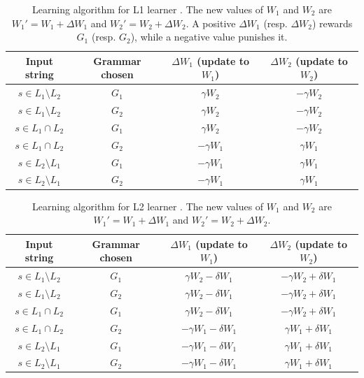 \begin{table}
\caption{Learning algorithm for L1 learner \parencite{BushMosteller1955,Yang2002}. The new values of $W_1$ and $W_2$ are $W_1' = W_1 + \Delta W_1$ and $W_2' = W_2 + \Delta W_2$. A positive $\Delta W_1$ (resp. $\Delta W_2$) rewards $G_1$ (resp. $G_2$), while a negative value punishes it.}\label{tbl-BM}

\begin{tabular}{cccc}
\toprule
Input string & Grammar chosen & $\Delta W_1$ (update to $W_1$) & $\Delta W_2$ (update to $W_2$) \\
\midrule
$s \in L_1 \setminus L_2$  & $G_1$          & $\gamma W_2$           & $-\gamma W_2$ \\
$s \in L_1 \setminus L_2$  & $G_2$          & $\gamma W_2$ & $-\gamma W_2$ \\
$s \in L_1 \cap L_2$ & $G_1$ & $\gamma W_2$ & $-\gamma W_2$ \\
$s \in L_1 \cap L_2$ & $G_2$ & $ - \gamma W_1$ & $\gamma W_1$ \\
$s \in L_2 \setminus L_1$ & $G_1$ & $- \gamma W_1$ & $\gamma W_1$ \\
$s \in L_2 \setminus L_1$ & $G_2$ & $- \gamma W_1$ & $\gamma W_1$ \\
\bottomrule
\end{tabular}
\end{table}

\begin{table}
\caption{Learning algorithm for L2 learner \parencite{Kauhanen2022}. The new values of $W_1$ and $W_2$ are $W_1' = W_1 + \Delta W_1$ and $W_2' = W_2 + \Delta W_2$.}\label{tbl-BM2}

\begin{tabular}{cccc}
\toprule
Input string & Grammar chosen & $\Delta W_1$ (update to $W_1$) & $\Delta W_2$ (update to $W_2$) \\
\midrule
$s \in L_1 \setminus L_2$  & $G_1$          & $\gamma W_2 - \delta W_1$           & $-\gamma W_2 + \delta W_1$ \\
$s \in L_1 \setminus L_2$  & $G_2$          & $\gamma W_2 - \delta W_1$ & $-\gamma W_2 + \delta W_1$ \\
$s \in L_1 \cap L_2$ & $G_1$ & $\gamma W_2 - \delta W_1$ & $-\gamma W_2 + \delta W_1$ \\
$s \in L_1 \cap L_2$ & $G_2$ & $- \gamma W_1 - \delta W_1$ & $\gamma W_1 + \delta W_1$ \\
$s \in L_2 \setminus L_1$ & $G_1$ & $- \gamma W_1 - \delta W_1$ & $\gamma W_1 + \delta W_1$ \\
$s \in L_2 \setminus L_1$ & $G_2$ & $- \gamma W_1 - \delta W_1$ & $\gamma W_1 + \delta W_1$ \\
\bottomrule
\end{tabular}
\end{table}

